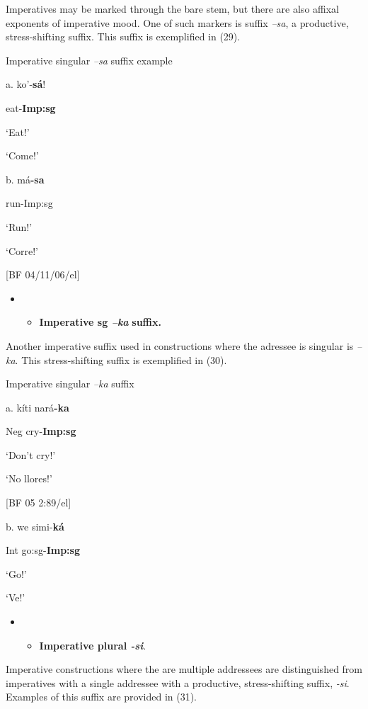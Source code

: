 Imperatives may be marked through the bare stem, but there are also affixal exponents of imperative mood. One of such markers is suffix \textit{–sa}, a productive, stress-shifting suffix. This suffix is exemplified in (29).

   Imperative singular \textit{–sa} suffix example

  a.  ko’-\textbf{sá}!

    eat-\textbf{Imp:sg}

    ‘Eat!’

    ‘Come!’            

  b.  má\textbf{{}-sa}

    run-Imp:sg

    ‘Run!’

    ‘Corre!’            

    [BF 04/11/06/el]

\begin{itemize}
\item \begin{itemize}
\item \textbf{Imperative sg \textit{–ka} }\textbf{suffix.}
\end{itemize}
\end{itemize}

Another imperative suffix used in constructions where the adressee is singular is \textit{–ka}. This stress-shifting suffix is exemplified in (30).

   Imperative singular \textit{–ka} suffix

a.    kíti   nará\textbf{{}-ka}

Neg   cry-\textbf{Imp:sg}      

‘Don’t cry!’  

‘No llores!’            

[BF 05 2:89/el]

  b.  we  simi-\textbf{ká}

 Int  go:sg-\textbf{Imp:sg}

 ‘Go!’

    ‘Ve!’              

\begin{itemize}
\item \begin{itemize}
\item \textbf{Imperative plural \textit{{}-si}}.
\end{itemize}
\end{itemize}

Imperative constructions where the are multiple addressees are distinguished from imperatives with a single addressee with a productive, stress-shifting suffix, \textit{{}-si}. Examples of this suffix are provided in (31).

